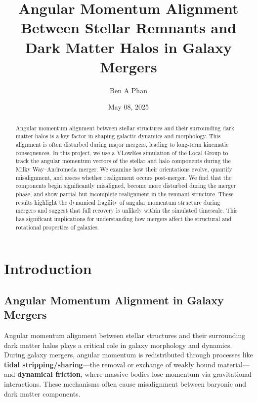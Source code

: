 \documentclass[twocolumn]{aastex631}
\begin{document}
\title{Angular Momentum Alignment Between Stellar Remnants and Dark Matter Halos in Galaxy Mergers}
\author{Ben A Phan}
\date{May 08, 2025}

\begin{abstract}
    Angular momentum alignment between stellar structures and their surrounding dark matter halos is a key factor in shaping galactic dynamics and morphology. This alignment is often disturbed during major mergers, leading to long-term kinematic consequences. In this project, we use a VLowRes simulation of the Local Group to track the angular momentum vectors of the stellar and halo components during the Milky Way–Andromeda merger. We examine how their orientations evolve, quantify misalignment, and assess whether realignment occurs post-merger. We find that the components begin significantly misaligned, become more disturbed during the merger phase, and show partial but incomplete realignment in the remnant structure. These results highlight the dynamical fragility of angular momentum structure during mergers and suggest that full recovery is unlikely within the simulated timescale. This has significant implications for understanding how mergers affect the structural and rotational properties of galaxies.
\end{abstract}





\section{Introduction}

\subsection{Angular Momentum Alignment in Galaxy Mergers}

Angular momentum alignment between stellar structures and their surrounding dark matter halos plays a critical role in galaxy morphology and dynamics. During galaxy mergers, angular momentum is redistributed through processes like \textbf{tidal stripping/sharing}—the removal or exchange of weakly bound material—and \textbf{dynamical friction}, where massive bodies lose momentum via gravitational interactions. These mechanisms often cause misalignment between baryonic and dark matter components.
\end{document}
